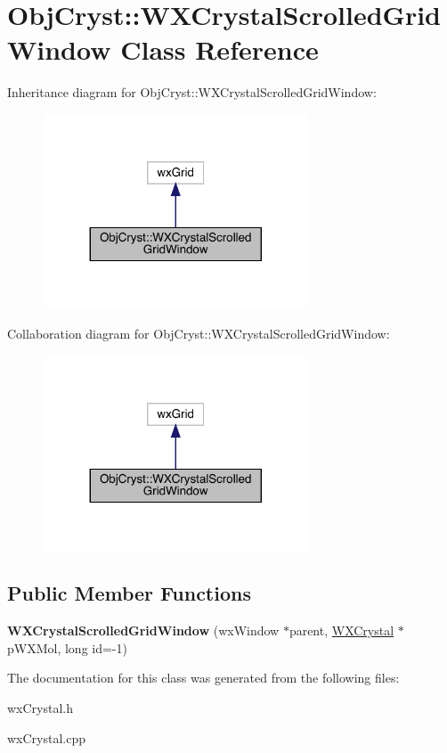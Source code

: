 \hypertarget{class_obj_cryst_1_1_w_x_crystal_scrolled_grid_window}{}\section{Obj\+Cryst\+::W\+X\+Crystal\+Scrolled\+Grid\+Window Class Reference}
\label{class_obj_cryst_1_1_w_x_crystal_scrolled_grid_window}


Inheritance diagram for Obj\+Cryst\+::W\+X\+Crystal\+Scrolled\+Grid\+Window\+:
\nopagebreak
\begin{figure}[H]
\begin{center}
\leavevmode
\includegraphics[width=224pt]{class_obj_cryst_1_1_w_x_crystal_scrolled_grid_window__inherit__graph}
\end{center}
\end{figure}


Collaboration diagram for Obj\+Cryst\+::W\+X\+Crystal\+Scrolled\+Grid\+Window\+:
\nopagebreak
\begin{figure}[H]
\begin{center}
\leavevmode
\includegraphics[width=224pt]{class_obj_cryst_1_1_w_x_crystal_scrolled_grid_window__coll__graph}
\end{center}
\end{figure}
\subsection*{Public Member Functions}
\begin{DoxyCompactItemize}
\item 
\mbox{\label{class_obj_cryst_1_1_w_x_crystal_scrolled_grid_window_ab1765e468938afa74ea1f3142b675d20}} 
{\bfseries W\+X\+Crystal\+Scrolled\+Grid\+Window} (wx\+Window $\ast$parent, \mbox{\hyperlink{class_obj_cryst_1_1_w_x_crystal}{W\+X\+Crystal}} $\ast$p\+W\+X\+Mol, long id=-\/1)
\end{DoxyCompactItemize}


The documentation for this class was generated from the following files\+:\begin{DoxyCompactItemize}
\item 
wx\+Crystal.\+h\item 
wx\+Crystal.\+cpp\end{DoxyCompactItemize}
